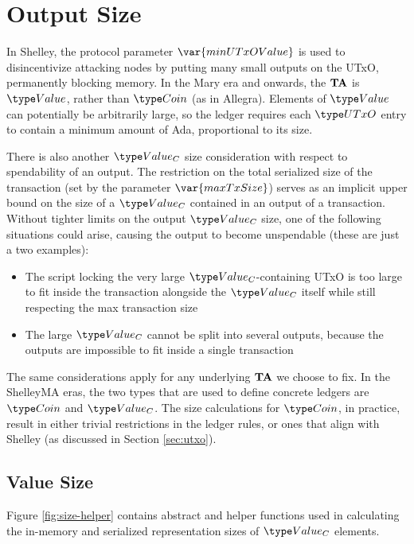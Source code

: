 \section{Output Size}
\label{sec:value-size}

In Shelley, the protocol parameter $\var{minUTxOValue}$ is used to
disincentivize attacking nodes by putting many small outputs on the
UTxO, permanently blocking memory. In the Mary era
and onwards, the $\mathbf{TA}$ is $\Value$, rather than $\Coin$ (as in Allegra). Elements of $\Value$
can potentially be arbitrarily large, so the ledger requires each $\UTxO$ entry to
contain a minimum amount of Ada, proportional to its size.

There is also another $\Value_C$ size consideration with respect to spendability
of an output. The restriction on the total serialized size of the transaction (set
by the parameter $\var{maxTxSize}$) serves as an implicit upper bound on the
size of a $\Value_C$ contained in an output of a transaction. Without tighter
limits on the output $\Value_C$ size, one of the following situations could arise,
causing the output to become unspendable (these are just a two examples):

\begin{itemize}
  \item The script locking the very large $\Value_C$-containing UTxO is too large
  to fit inside the transaction alongside the $\Value_C$ itself while still respecting
  the max transaction size
  \item The large $\Value_C$ cannot be split into several outputs, because the
  outputs are impossible to fit inside a single transaction
\end{itemize}

The same considerations apply for any underlying $\mathbf{TA}$ we choose to fix.
In the ShelleyMA eras, the two types that are used to define concrete ledgers are $\Coin$ and $\Value_C$.
The size calculations for $\Coin$, in practice,
result in either trivial restrictions in the ledger rules,
or ones that align with Shelley (as discussed in Section \ref{sec:utxo}).

\subsection{Value Size}

Figure \ref{fig:size-helper} contains abstract and helper functions
used in calculating the in-memory and serialized representation
sizes of $\Value_C$ elements.

